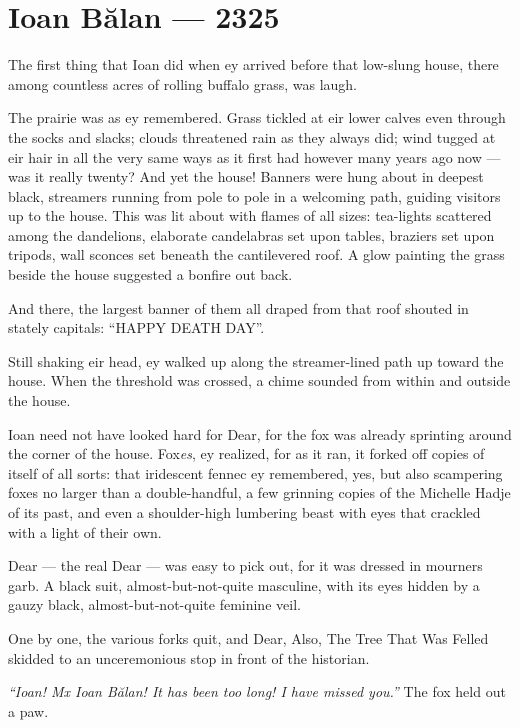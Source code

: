 \hypertarget{ioan-bux103lan-2325}{%
\chapter{Ioan Bălan — 2325}\label{ioan-bux103lan-2325}}

The first thing that Ioan did when ey arrived before that low-slung house, there among countless acres of rolling buffalo grass, was laugh.

The prairie was as ey remembered. Grass tickled at eir lower calves even through the socks and slacks; clouds threatened rain as they always did; wind tugged at eir hair in all the very same ways as it first had however many years ago now — was it really twenty? And yet the house! Banners were hung about in deepest black, streamers running from pole to pole in a welcoming path, guiding visitors up to the house. This was lit about with flames of all sizes: tea-lights scattered among the dandelions, elaborate candelabras set upon tables, braziers set upon tripods, wall sconces set beneath the cantilevered roof. A glow painting the grass beside the house suggested a bonfire out back.

And there, the largest banner of them all draped from that roof shouted in stately capitals: ``HAPPY DEATH DAY''.

Still shaking eir head, ey walked up along the streamer-lined path up toward the house. When the threshold was crossed, a chime sounded from within and outside the house.

Ioan need not have looked hard for Dear, for the fox was already sprinting around the corner of the house. Fox\emph{es}, ey realized, for as it ran, it forked off copies of itself of all sorts: that iridescent fennec ey remembered, yes, but also scampering foxes no larger than a double-handful, a few grinning copies of the Michelle Hadje of its past, and even a shoulder-high lumbering beast with eyes that crackled with a light of their own.

Dear — the real Dear — was easy to pick out, for it was dressed in mourners garb. A black suit, almost-but-not-quite masculine, with its eyes hidden by a gauzy black, almost-but-not-quite feminine veil.

One by one, the various forks quit, and Dear, Also, The Tree That Was Felled skidded to an unceremonious stop in front of the historian.

\emph{``Ioan! Mx Ioan Bălan! It has been too long! I have missed you.''} The fox held out a paw.

